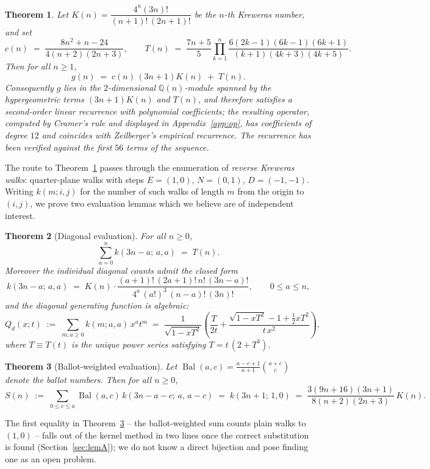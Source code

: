 \documentclass[11pt]{article}
\newtheorem{theorem}{Theorem}[section]
\newcommand{\Bal}{\operatorname{Bal}}
\begin{document}
\begin{theorem}\label{thm:main}
Let $K(n) = \dfrac{4^n(3n)!}{(n+1)!\,(2n+1)!}$ be the $n$-th Kreweras number, and set
\[ c(n) \;=\; \frac{8n^2+n-24}{4(n+2)(2n+3)},\qquad
T(n) \;=\; \frac{7n+5}{5}\prod_{k=1}^{n}\frac{6(2k-1)(6k-1)(6k+1)}{(k+1)(4k+3)(4k+5)}. \]
Then for all $n\ge 1$,
\[ g(n) \;=\; c(n)\,(3n+1)K(n) \;+\; T(n). \]
Consequently $g$ lies in the $2$-dimensional $\mathbb{Q}(n)$-module spanned by the hypergeometric terms $(3n+1)K(n)$ and $T(n)$, and therefore satisfies a second-order linear recurrence with polynomial coefficients; the resulting operator, computed by Cramer's rule and displayed in Appendix~\ref{app:op}, has coefficients of degree $12$ and coincides with Zeilberger's empirical recurrence. The recurrence has been verified against the first $56$ terms of the sequence.
\end{theorem}

The route to Theorem~\ref{thm:main} passes through the enumeration of \emph{reverse Kreweras walks}: quarter-plane walks with steps $E=(1,0)$, $N=(0,1)$, $D=(-1,-1)$. Writing $k(m;i,j)$ for the number of such walks of length $m$ from the origin to $(i,j)$, we prove two evaluation lemmas which we believe are of independent interest.

\begin{theorem}[Diagonal evaluation]\label{thm:B}
For all $n\ge 0$,
\[ \sum_{a=0}^{n} k(3n-a;\,a,a) \;=\; T(n). \]
Moreover the individual diagonal counts admit the closed form
\[ k(3n-a;\,a,a) \;=\; K(n)\cdot\frac{(a+1)!\,(2a+1)!\,n!\,(3n-a)!}{4^{a}\,(a!)^{3}\,(n-a)!\,(3n)!},\qquad 0\le a\le n, \]
and the diagonal generating function is algebraic:
\begin{equation}\label{eq:Qd}
Q_d(x;t) \;:=\; \sum_{m,a\ge0} k(m;a,a)\,x^a t^m \;=\;
\frac{1}{\sqrt{1-xT^2}}\left(\frac{T}{2t} + \frac{\sqrt{1-xT^2}-1+\tfrac{1}{2}xT^2}{t\,x^{2}}\right),
\end{equation}
where $T\equiv T(t)$ is the unique power series satisfying $T = t\,(2+T^{3})$.
\end{theorem}

\begin{theorem}[Ballot-weighted evaluation]\label{thm:A}
Let $\Bal(a,c) = \frac{a-c+1}{a+1}\binom{a+c}{c}$ denote the ballot numbers. Then for all $n\ge0$,
\[ S(n) \;:=\; \sum_{0\le c\le a} \Bal(a,c)\, k(3n-a-c;\,a,\,a-c) \;=\; k(3n+1;\,1,0) \;=\; \frac{3(9n+16)(3n+1)}{8(n+2)(2n+3)}\,K(n). \]
\end{theorem}

The first equality in Theorem~\ref{thm:A} -- the ballot-weighted sum counts plain walks to $(1,0)$ -- falls out of the kernel method in two lines once the correct substitution is found (Section~\ref{sec:lemA}); we do not know a direct bijection and pose finding one as an open problem.
\end{document}
